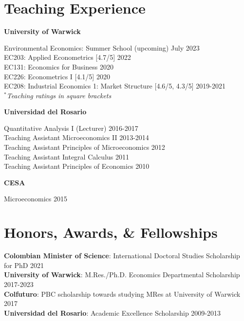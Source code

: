 \documentclass[10pt,letterpaper]{article}
\renewenvironment{itemize}{
  \begin{list}{}{
    \setlength{\leftmargin}{1.5em}
  }
}{
  \end{list}
}
\begin{document}
\section*{Teaching Experience}
\begin{itemize}
\item {\bf University of Warwick}
\begin{itemize}
    \item Environmental Economics: Summer School (upcoming) \hfill July 2023 \\
    EC203: Applied Econometrics [4.7/5] \hfill 2022\\
    EC131: Economics for Business \hfill 2020 \\
    EC226: Econometrics I [4.1/5] \hfill 2020 \\
    EC208: Industrial Economics 1: Market Structure [4.6/5, 4.3/5] \hfill 2019-2021 \\
    $^*$\emph{Teaching ratings in square brackets}
\end{itemize}

\item {\bf Universidad del Rosario}
\begin{itemize}
\item  Quantitative Analysis I (Lecturer) \hfill 2016-2017 \\
 Teaching Assistant Microeconomics II \hfill 2013-2014 \\
  Teaching Assistant Principles of Microeconomics \hfill 2012
   \\ Teaching Assistant Integral Calculus \hfill 2011
\\ Teaching Assistant Principles of Economics \hfill 2010 
\end{itemize}

\item {\bf CESA}
\begin{itemize}
\item  Microeconomics \hfill 2015
\end{itemize}
\end{itemize}

\section*{Honors, Awards, \& Fellowships}

\begin{itemize}
    \item {\bf Colombian Minister of Science}: International Doctoral Studies Scholarship for PhD \hfill 2021
    \\ {\bf University of Warwick}: M.Res./Ph.D. Economics Departmental Scholarship \hfill 2017-2023
    \\ {\bf Colfuturo}: PBC scholarship towards studying MRes at University of Warwick \hfill 2017
    \\ {\bf Universidad del Rosario}: Academic Excellence Scholarship \hfill 2009-2013
\end{itemize}
\end{document}
